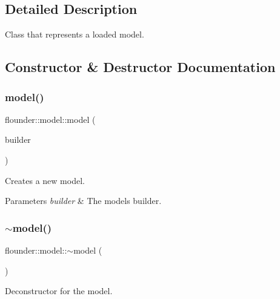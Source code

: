 \subsection{Detailed Description}
Class that represents a loaded model. 



\subsection{Constructor \& Destructor Documentation}
\mbox{\label{classflounder_1_1model_a6a27604e53fce127b6f6da4fb4d74972}} 
\subsubsection{\texorpdfstring{model()}{model()}}
{\footnotesize\ttfamily flounder\+::model\+::model (\begin{DoxyParamCaption}\item[{\hyperlink{classflounder_1_1model_1_1builder}{builder} $\ast$}]{builder }\end{DoxyParamCaption})\hspace{0.3cm}{\ttfamily [protected]}}



Creates a new model. 


\begin{DoxyParams}{Parameters}
{\em builder} & The models builder. \\
\hline
\end{DoxyParams}
\mbox{\label{classflounder_1_1model_afd864365f858cc9bc0bf260bb6212a76}} 
\subsubsection{\texorpdfstring{$\sim$model()}{~model()}}
{\footnotesize\ttfamily flounder\+::model\+::$\sim$model (\begin{DoxyParamCaption}{ }\end{DoxyParamCaption})}



Deconstructor for the model. 



